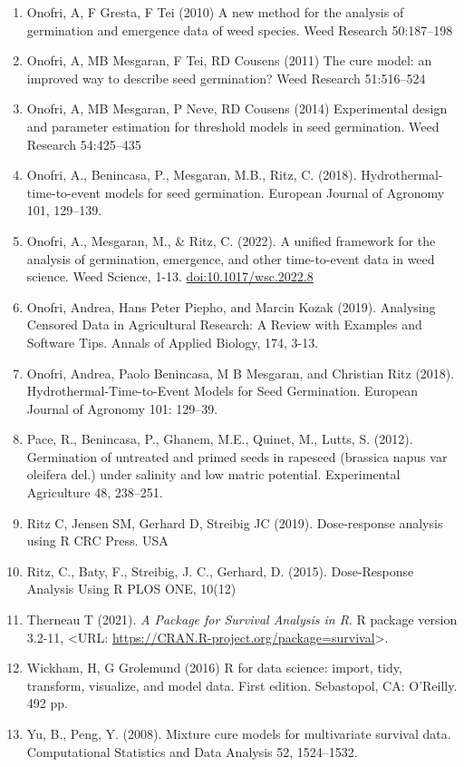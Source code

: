 \documentclass[
]{book}
\begin{document}
\begin{enumerate}
\item
  Onofri, A, F Gresta, F Tei (2010) A new method for the analysis of germination and emergence data of weed species. Weed Research 50:187--198
\item
  Onofri, A, MB Mesgaran, F Tei, RD Cousens (2011) The cure model: an improved way to describe seed germination? Weed Research 51:516--524
\item
  Onofri, A, MB Mesgaran, P Neve, RD Cousens (2014) Experimental design and parameter estimation for threshold models in seed germination. Weed Research 54:425--435
\item
  Onofri, A., Benincasa, P., Mesgaran, M.B., Ritz, C. (2018). Hydrothermal-time-to-event models for seed germination. European Journal of Agronomy 101, 129--139.
\item
  Onofri, A., Mesgaran, M., \& Ritz, C. (2022). A unified framework for the analysis of germination, emergence, and other time-to-event data in weed science. Weed Science, 1-13. \url{doi:10.1017/wsc.2022.8}
\item
  Onofri, Andrea, Hans Peter Piepho, and Marcin Kozak (2019). Analysing Censored Data in Agricultural Research: A Review with Examples and Software Tips. Annals of Applied Biology, 174, 3-13.
\item
  Onofri, Andrea, Paolo Benincasa, M B Mesgaran, and Christian Ritz (2018). Hydrothermal-Time-to-Event Models for Seed Germination. European Journal of Agronomy 101: 129--39.
\item
  Pace, R., Benincasa, P., Ghanem, M.E., Quinet, M., Lutts, S. (2012). Germination of untreated and primed seeds in rapeseed (brassica napus var oleifera del.) under salinity and low matric potential. Experimental Agriculture 48, 238--251.
\item
  Ritz C, Jensen SM, Gerhard D, Streibig JC (2019). Dose-response analysis using R CRC Press. USA
\item
  Ritz, C., Baty, F., Streibig, J. C., Gerhard, D. (2015). Dose-Response Analysis Using R PLOS ONE, 10(12)
\item
  Therneau T (2021). \emph{A Package for Survival Analysis in R}. R package version 3.2-11, \textless URL: \url{https://CRAN.R-project.org/package=survival}\textgreater.
\item
  Wickham, H, G Grolemund (2016) R for data science: import, tidy, transform, visualize, and model data. First edition. Sebastopol, CA: O'Reilly. 492 pp.
\item
  Yu, B., Peng, Y. (2008). Mixture cure models for multivariate survival data. Computational Statistics and Data Analysis 52, 1524--1532.

\end{enumerate}
\end{document}
